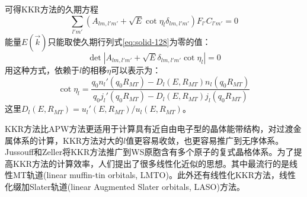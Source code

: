 可得KKR方法的久期方程
\begin{equation}
  \sum_{l'm'}(A_{lm,l'm'}+\sqrt E\cot\eta_l\delta_{lm,l'm'})F_{l'}C_{l'm'}=0
  \label{eq:solid-127}
\end{equation}
能量$E(\vec k)$只能取使久期行列式\eqref{eq:solid-128}为零的值：
\begin{equation}
  \det|A_{lm,l'm'}+\sqrt E\delta_{lm,l'm'}\cot\eta_l|=0
  \label{eq:solid-128}
\end{equation}
用这种方式，依赖于$l$的相移$\eta$可以表示为：
\begin{equation}
  \cot\eta_l=\dfrac{q_0n_l'(q_0R_{MT})-D_l(E,R_{MT})n_l(q_0R_{MT})}{q_0j_l'(q_0R_{MT})-D_l(E,R_{MT})j_l(q_0R_{MT})}
  \label{eq:solid-129}
\end{equation}
这里$D_l(E,R_{MT})=u_l'(E,R_{MT})/u_l(E,R_{MT})$。

KKR方法比APW方法更适用于计算具有近自由电子型的晶体能带结构，对过渡金属体系的计算，KKR方法对大的$l$值更容易收敛\cite{PPS86-337_1965,PR145-599_1966,Nemoshkalenko-Antonov}，也更容易推广到无序体系。Jussouff和Zeller将KKR方法推广到WS原胞含有多个原子的复式晶格体系\cite{JPF11-1771_1981}。为了提高KKR方法的计算效率，人们提出了很多线性化近似的思想\cite{Andersen,PRB4-1064_1971,SSC11-799_1972,Andersen-unpub-1,Skriver}。其中最流行的是线性MT轨道(linear muffin-tin orbitals, LMTO)\cite{SSC13-133_1973,Andersen-unpub-2}。此外还有线性化KKR方法\cite{Ziesche-Lehmann,PSSB97-449_1980}，线性化缀加Slater轨道(linear Augmented Slater orbitals, LASO)方法\cite{PRB29-2896_1984}。


